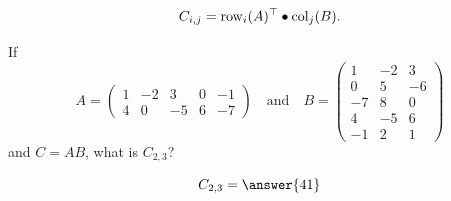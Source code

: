 \documentclass{ximera}
\begin{document}
\[
C_{i,j} = \operatorname{row}_i(A)^\top\bullet \operatorname{col}_j(B).
\]
\begin{question} If
  \[
  A = \begin{pmatrix}
1 & -2 & 3 & 0 & -1 \\
4 & 0 & -5 & 6 & -7
  \end{pmatrix}\quad\text{and}\quad
  B=
  \begin{pmatrix}
1 & -2 & 3 \\
0 & 5 & -6 \\
-7 & 8 & 0 \\
4 & -5 & 6 \\
-1 & 2 & 1
\end{pmatrix}
  \]
  and $C = AB$, what is $C_{2,3}$?
  \begin{prompt}
    \[
    C_{2,3} = \answer{41}
    \]
  \end{prompt}
\end{question}












\end{document}
